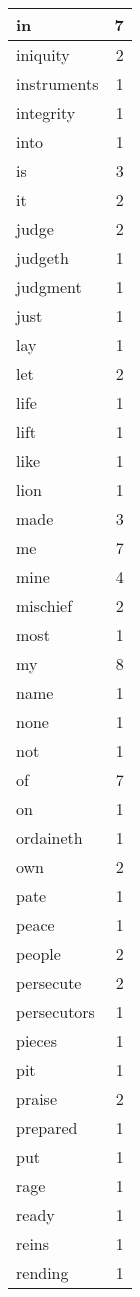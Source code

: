 \begin{center}
\begin{longtable}{l|r}
in & 7 \\ \hline
iniquity & 2 \\ \hline
instruments & 1 \\ \hline
integrity & 1 \\ \hline
into & 1 \\ \hline
is & 3 \\ \hline
it & 2 \\ \hline
judge & 2 \\ \hline
judgeth & 1 \\ \hline
judgment & 1 \\ \hline
just & 1 \\ \hline
lay & 1 \\ \hline
let & 2 \\ \hline
life & 1 \\ \hline
lift & 1 \\ \hline
like & 1 \\ \hline
lion & 1 \\ \hline
made & 3 \\ \hline
me & 7 \\ \hline
mine & 4 \\ \hline
mischief & 2 \\ \hline
most & 1 \\ \hline
my & 8 \\ \hline
name & 1 \\ \hline
none & 1 \\ \hline
not & 1 \\ \hline
of & 7 \\ \hline
on & 1 \\ \hline
ordaineth & 1 \\ \hline
own & 2 \\ \hline
pate & 1 \\ \hline
peace & 1 \\ \hline
people & 2 \\ \hline
persecute & 2 \\ \hline
persecutors & 1 \\ \hline
pieces & 1 \\ \hline
pit & 1 \\ \hline
praise & 2 \\ \hline
prepared & 1 \\ \hline
put & 1 \\ \hline
rage & 1 \\ \hline
ready & 1 \\ \hline
reins & 1 \\ \hline
rending & 1 \\ \hline

\end{longtable}
\end{center}
